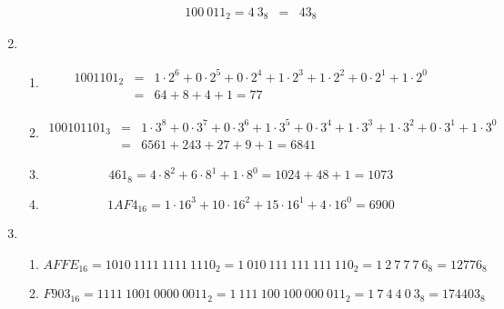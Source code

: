 \documentclass[DIN, pagenumber=false, fontsize=11pt, parskip=half]{scrartcl}
\begin{document}
\begin{enumerate}
\begin{enumerate}
\begin{eqnarray*}
                        {100\ 011}_2 = {4\ 3}_{8} &=& {43}_{8}
                    \end{eqnarray*}
            \end{enumerate}
        \item 
            \begin{enumerate}
                \item 
                    \begin{eqnarray*}
                        {1001101}_2 &=& 1 \cdot 2^6 + 0 \cdot 2^5 + 0 \cdot 2^4 + 1 \cdot 2^3 + 1 \cdot 2^2 + 0 \cdot 2^1 + 1 \cdot 2^0\\ 
                        &=& 64 + 8 + 4 + 1= 77
                    \end{eqnarray*}
                \item 
                    \begin{eqnarray*}
                        {100101101}_3 &=& 1 \cdot 3^8 + 0 \cdot 3^7 + 0 \cdot 3^6 + 1 \cdot 3^5 + 0 \cdot 3^4 + 1 \cdot 3^3 + 1 \cdot 3^2 + 0 \cdot 3^1 + 1 \cdot 3^0\\  
                        &=& 6561 + 243 + 27 + 9 + 1 = 6841
                    \end{eqnarray*}
                \item 
                    \begin{equation*}
                        {461}_{8} = 4 \cdot 8^2 + 6 \cdot 8^1 + 1 \cdot 8^0 = 1024 + 48 + 1 = 1073
                    \end{equation*}
                \item 
                    \begin{equation*}
                        {1AF4}_{16} = 1 \cdot 16^3 + 10 \cdot 16^2 + 15 \cdot 16^1 + 4 \cdot 16^0 = 6900
                    \end{equation*}
            \end{enumerate}
        \item 
            \begin{enumerate}
                \item 
                    \begin{equation*}
                        {AFFE}_{16} = {1010\ 1111\ 1111\ 1110}_2 = {1\ 010\ 111\ 111\ 111\ 110}_2 = {1\ 2\ 7\ 7\ 7\ 6}_8 = {12776}_8
                    \end{equation*}
                \item
                    \begin{equation*}
                        {F903}_{16} = {1111\ 1001\ 0000\ 0011}_2 = {1\ 111\ 100\ 100\ 000\ 011}_2 = {1\ 7\ 4\ 4\ 0\ 3}_8 = {174403}_8

\end{equation*}
\end{enumerate}
\end{enumerate}
\end{document}
